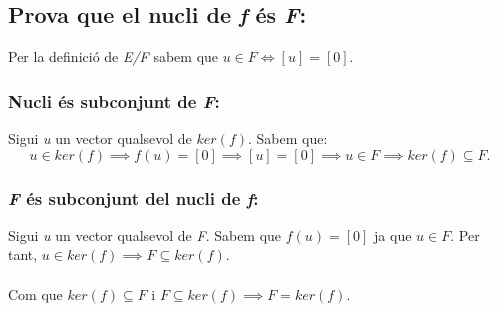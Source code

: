 \documentclass[a4paper, 11pt]{article}
\begin{document}
        \subsection{Prova que el nucli de \emph{f} \'es \emph{F}:}
            Per la definici\'o de \emph{E/F} sabem que ${u\in F \iff [u] = [0]}$.

            \subsubsection{Nucli \'es subconjunt de \emph{F}:}
                Sigui \emph{u} un vector qualsevol de ${ker(f)}$. Sabem que:
                \begin{equation*}
                    u \in ker(f) \implies f(u) = [0] \implies [u] = [0] \implies u\in F \implies ker(f) \subseteq F.
                \end{equation*}

            \subsubsection{\emph{F} \'es subconjunt del nucli de \emph{f}:}
                Sigui \emph{u} un vector qualsevol de \emph{F}. Sabem que ${f(u) = [0]}$ ja que ${u\in F}$. Per tant, ${u \in ker(f) \implies F \subseteq ker(f)}$.\\\\
            Com que ${ker(f) \subseteq F \text{ i } F \subseteq ker(f) \implies F = ker(f)}$.
\end{document}
